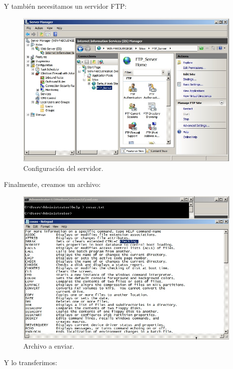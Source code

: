 \documentclass[paper=a4, fontsize=11pt]{scrartcl} %
\numberwithin{equation}{section} %
\numberwithin{figure}{section} %
\numberwithin{table}{section} %
\begin{document}
\begin{enumerate}
		Y también necesitamos un servidor FTP:
		
		\begin{figure}[H]
			\centering
			\includegraphics[width=15cm]{Ejercicio_15d.jpg}
			\caption{Configuración del servidor.}
			\label{fig:server}
		\end{figure}
		
		Finalmente, creamos un archivo:
		
		\begin{figure}[H]
			\centering
			\includegraphics[width=15cm]{Ejercicio_15e.jpg}
			\caption{Archivo a enviar.}
			\label{fig:send}
		\end{figure}
		
		Y lo transferimos:
		

\end{enumerate}
\end{document}
